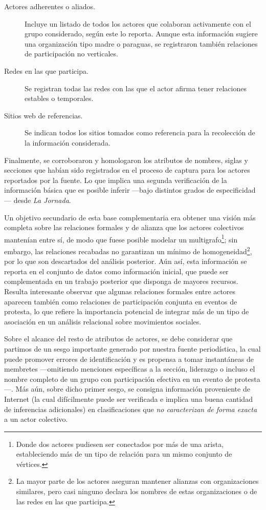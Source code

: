 \documentclass[letterpaper, 11pt]{book}
\theoremstyle{definition}
\theoremstyle{remark}
\begin{document}
\begin{description}
    \item[Actores adherentes o aliados.] Incluye un listado de todos los actores que colaboran activamente con el grupo considerado, según este lo reporta. 
    Aunque esta información sugiere una organización tipo madre o paraguas, se registraron también relaciones de participación no verticales.
    
    \item[Redes en las que participa.] Se registran todas las redes con las que el actor afirma tener relaciones estables o temporales.
    
    \item[Sitios web de referencias.] Se indican todos los sitios tomados como referencia para la recolección de la información considerada.
\end{description}

Finalmente, se corroboraron y homologaron los atributos de nombres, siglas y secciones que habían sido registrados en el proceso de captura para los actores reportados por la fuente. Lo que implica una segunda verificación de la información básica que es posible inferir ---bajo distintos grados de especificidad--- desde \emph{La Jornada}.


Un objetivo secundario de esta base complementaria era obtener una visión más completa sobre las relaciones formales y de alianza que los actores colectivos mantenían entre sí, de modo que fuese posible modelar un multigrafo\footnote{
    Donde dos actores pudiesen ser conectados por más de una arista, estableciendo más de un tipo de relación para un mismo conjunto de vértices.
}; 
sin embargo, las relaciones recabadas no garantizan un mínimo de homogeneidad\footnote{
    La mayor parte de los actores aseguran mantener alianzas con organizaciones similares, pero casi ninguno declara los nombres de estas organizaciones o de las redes en las que participa.
}, 
por lo que son descartados del análisis posterior. 
Aún así, esta información se reporta en el conjunto de datos como información inicial, que puede ser complementada en un trabajo posterior que disponga de mayores recursos. 
Resulta interesante observar que algunas relaciones formales entre actores aparecen también como relaciones de participación conjunta en eventos de protesta, lo que refiere la importancia potencial de integrar más de un tipo de asociación en un análisis relacional sobre movimientos sociales.


Sobre el alcance del resto de atributos de actores, se debe considerar que partimos de un sesgo importante generado por nuestra fuente periodística, la cual puede promover errores de identificación y es propensa a tomar instantáneas de membretes ---omitiendo menciones específicas a la sección, liderazgo o incluso el nombre completo de un grupo con participación efectiva en un evento de protesta---. 
Más aún, sobre dicho primer sesgo, se consigna información proveniente de Internet (la cual difícilmente puede ser verificada e implica una buena cantidad de inferencias adicionales) en clasificaciones que \emph{no caracterizan de forma exacta} a un actor colectivo.
\end{document}
